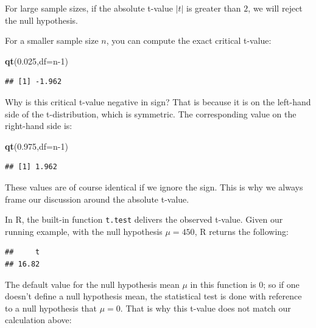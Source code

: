 \documentclass[12pt,]{krantz}
\newenvironment{Shaded}{\begin{snugshade}}{\end{snugshade}}
\newcommand{\CommentTok}[1]{\textcolor[rgb]{0.56,0.35,0.01}{\textit{#1}}}
\newcommand{\DataTypeTok}[1]{\textcolor[rgb]{0.13,0.29,0.53}{#1}}
\newcommand{\DecValTok}[1]{\textcolor[rgb]{0.00,0.00,0.81}{#1}}
\newcommand{\FloatTok}[1]{\textcolor[rgb]{0.00,0.00,0.81}{#1}}
\newcommand{\KeywordTok}[1]{\textcolor[rgb]{0.13,0.29,0.53}{\textbf{#1}}}
\newcommand{\NormalTok}[1]{#1}
\newcommand{\OperatorTok}[1]{\textcolor[rgb]{0.81,0.36,0.00}{\textbf{#1}}}
\begin{document}
For large sample sizes, if the absolute t-value \(|t|\) is greater than \(2\), we will reject the null hypothesis.

For a smaller sample size \(n\), you can compute the exact critical t-value:

\begin{Shaded}
\begin{Highlighting}[]
\KeywordTok{qt}\NormalTok{(}\FloatTok{0.025}\NormalTok{,}\DataTypeTok{df=}\NormalTok{n}\DecValTok{-1}\NormalTok{)}
\end{Highlighting}
\end{Shaded}

\begin{verbatim}
## [1] -1.962
\end{verbatim}

Why is this critical t-value negative in sign? That is because it is on the left-hand side of the t-distribution, which is symmetric.
The corresponding value on the right-hand side is:

\begin{Shaded}
\begin{Highlighting}[]
\KeywordTok{qt}\NormalTok{(}\FloatTok{0.975}\NormalTok{,}\DataTypeTok{df=}\NormalTok{n}\DecValTok{-1}\NormalTok{)}
\end{Highlighting}
\end{Shaded}

\begin{verbatim}
## [1] 1.962
\end{verbatim}

These values are of course identical if we ignore the sign. This is why we always frame our discussion around the absolute t-value.

In R, the built-in function \texttt{t.test} delivers the observed t-value. Given our running example, with the null hypothesis \(\mu=450\), R returns the following:

\begin{Shaded}
\end{Shaded}

\begin{verbatim}
##     t 
## 16.82
\end{verbatim}

The default value for the null hypothesis mean \(\mu\) in this function is 0; so if one doesn't define a null hypothesis mean, the statistical test is done with reference to a null hypothesis that \(\mu=0\). That is why this t-value does not match our calculation above:
\end{document}
